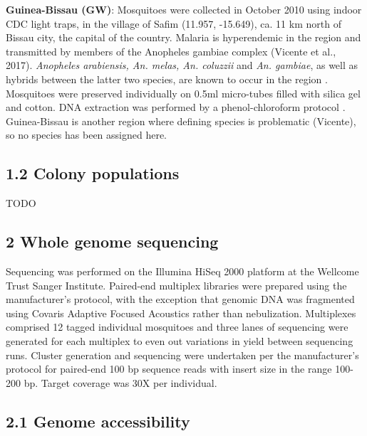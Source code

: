 \documentclass[a4paper,11pt,abstracton,hidelinks]{scrartcl}
\begin{document}
%
\textbf{Guinea-Bissau (GW)}: Mosquitoes were collected in October 2010 using indoor CDC light traps, in the village of Safim (11.957, -15.649), ca. 11 km north of Bissau city, the capital of the country.
%
Malaria is hyperendemic in the region and transmitted by members of the Anopheles gambiae complex (Vicente et al., 2017).
%
\textit{Anopheles arabiensis, An. melas, An. coluzzii} and \textit{An. gambiae}, as well as hybrids between the latter two species, are known to occur in the region \cite{Gordicho2014, Vicente2017}.
%
Mosquitoes were preserved individually on 0.5ml micro-tubes filled with silica gel and cotton. DNA extraction was performed by a phenol-chloroform protocol \cite{Donnelly1999}.
%
Guinea-Bissau is another region where defining species is problematic (Vicente), so no species has been assigned here.

\subsection*{1.2 Colony populations}

TODO

\subsection*{2 Whole genome sequencing}

%
Sequencing was performed on the Illumina HiSeq 2000 platform at the Wellcome Trust Sanger Institute.
%
Paired-end multiplex libraries were prepared using the manufacturer's protocol, with the exception that genomic DNA was fragmented using Covaris Adaptive Focused Acoustics rather than nebulization.
%
Multiplexes comprised 12 tagged individual mosquitoes and three lanes of sequencing were generated for each multiplex to even out variations in yield between sequencing runs.
%
Cluster generation and sequencing were undertaken per the manufacturer's protocol for paired-end 100 bp sequence reads with insert size in the range 100-200 bp.
%
Target coverage was 30X per individual.


\subsection*{2.1 Genome accessibility}
\end{document}
